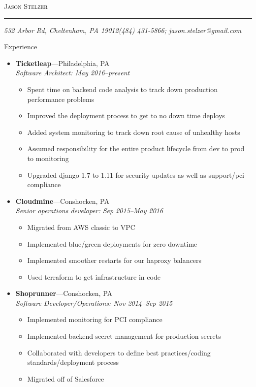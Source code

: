 \documentclass[11pt,oneside]{article}
\makeatletter
\newcommand{\name}{Jason Stelzer}
\newcommand{\addr}{532 Arbor Rd, Cheltenham, PA 19012}
\newcommand{\phone}{(484) 431-5866}
\newcommand{\email}{jason.stelzer@gmail.com}
\newcommand{\bigname}[1]{
        \begin{center}\fontfamily{phv}\selectfont\Huge\scshape#1\end{center}
}
\newenvironment{ressection}[1]{
        \vspace{4pt}
        {\fontfamily{phv}\selectfont\Large#1}
        \begin{itemize}
        \vspace{3pt}
}{
        \end{itemize}
}
\newcommand{\ressubitem}[1]{
        \vspace{-1pt}
        \item \begin{flushleft} #1 \end{flushleft}
}
\newcommand{\resbigitem}[3]{
        \vspace{-5pt}
        \item
        \textbf{#1}---#2 \\
        \textit{#3}
}
\newenvironment{ressubsec}[3]{
        \resbigitem{#1}{#2}{#3}
        \vspace{-2pt}
        \begin{itemize}
}{
        \end{itemize}
}
\makeatother
\begin{document}
 \selectfont

\bigname{\name}

\vspace{-8pt} \rule{\textwidth}{1pt}

\vspace{-1pt} {\small\itshape \addr \hfill \phone; \email}

\vspace{8 pt}

\begin{ressection}{Experience}
        \begin{ressubsec}{Ticketleap}{Philadelphia, PA}{Software Architect: May 2016--present}

          \ressubitem{Spent time on backend code analysis to track down production performance problems }          
          \ressubitem{Improved the deployment process to get to no down time deploys }
          \ressubitem{Added system monitoring to track down root cause of unhealthy hosts}
          \ressubitem{Assumed responsibility for the entire product lifecycle from dev to prod to monitoring }
          \ressubitem{Upgraded django 1.7 to 1.11 for security updates as well as support/pci compliance }
        \end{ressubsec}
  
        \begin{ressubsec}{Cloudmine}{Conshocken, PA}{Senior operations developer: Sep 2015--May 2016}

          \ressubitem{Migrated from AWS classic to VPC }
          \ressubitem{Implemented blue/green deployments for zero downtime }
          \ressubitem{Implemented smoother restarts for our haproxy balancers }
          \ressubitem{Used terraform to get infrastructure in code }          
        \end{ressubsec}
        
        \begin{ressubsec}{Shoprunner}{Conshocken, PA}{Software Developer/Operations: Nov 2014--Sep 2015}

          \ressubitem{Implemented monitoring for PCI compliance }
          \ressubitem{Implemented backend secret management for production secrets }
          \ressubitem{Collaborated with developers to define best practices/coding standards/deployment process}
          \ressubitem{Migrated off of Salesforce}
        \end{ressubsec}
        


\end{ressection}
\end{document}
